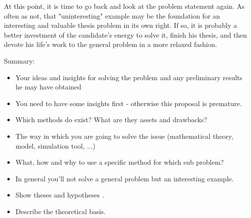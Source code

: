 At this point, it is time to go back and look at the problem statement again. As often as not, that "uninteresting" example may be the foundation for an interesting and valuable thesis problem in its own right. If so, it is probably a better investment of the candidate's energy to solve it, finish his thesis, and then devote his life's work to the general problem in a more relaxed fashion.

Summary:

\begin{itemize}
  \item Your ideas and insights for solving the problem and any preliminary results he may have obtained
  \item You need to have some insights first - otherwise this proposal is premature.
  \item Which methods do exist? What are they assets and drawbacks?
  \item The way in which you are going to solve the issue (mathematical theory, model, simulation tool, ...)
  \item What, how and why to use a specific method for which sub problem?
  \item In general you'll not solve a general problem but an interesting example. 
  \item Show theses and hypotheses .
  \item Describe the theoretical basis. 
\end{itemize}
